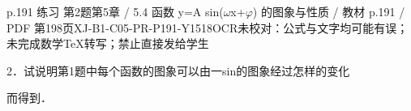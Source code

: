 \begin{bankitem}{p.191 练习 第2题}{第5章 / 5.4 函数 y=A sin(\ensuremath{\omega}x+\ensuremath{\varphi}) 的图象与性质 / 教材 p.191 / PDF 第198页}{XJ-B1-C05-PR-P191-Y1518}{OCR未校对：公式与文字均可能有误；未完成数学TeX转写；禁止直接发给学生}
\begin{ocrdraft}
\par
2．试说明第1题中每个函数的图象可以由一sin的图象经过怎样的变化
\par
而得到．
\end{ocrdraft}
\end{bankitem}
